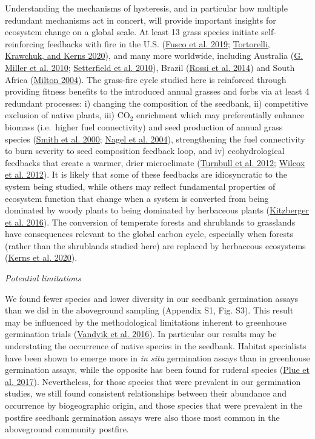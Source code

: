 \documentclass[
  12pt,
]{article}
\begin{document}
Understanding the mechanisms of hysteresis, and in particular how
multiple redundant mechanisms act in concert, will provide important
insights for ecosystem change on a global scale. At least 13 grass
species initiate self-reinforcing feedbacks with fire in the U.S.
(\protect\hyperlink{ref-Fusco2019}{Fusco et al. 2019};
\protect\hyperlink{ref-Tortorelli2020}{Tortorelli, Krawchuk, and Kerns
2020}), and many more worldwide, including Australia
(\protect\hyperlink{ref-Miller2010}{G. Miller et al. 2010};
\protect\hyperlink{ref-Setterfield2010}{Setterfield et al. 2010}),
Brazil (\protect\hyperlink{ref-Rossi2014}{Rossi et al. 2014}) and South
Africa (\protect\hyperlink{ref-Milton2004}{Milton 2004}). The grass-fire
cycle studied here is reinforced through providing fitness benefits to
the introduced annual grasses and forbs via at least 4 redundant
processes: i) changing the composition of the seedbank, ii) competitive
exclusion of native plants, iii) CO\(_2\) enrichment which may
preferentially enhance biomass (i.e.~higher fuel connectivity) and seed
production of annual grass species
(\protect\hyperlink{ref-Smith2000}{Smith et al. 2000};
\protect\hyperlink{ref-Nagel2004}{Nagel et al. 2004}), strengthening the
fuel connectivity to burn severity to seed composition feedback loop,
and iv) ecohydrological feedbacks that create a warmer, drier
microclimate (\protect\hyperlink{ref-Turnbull2012}{Turnbull et al.
2012}; \protect\hyperlink{ref-Wilcox2012}{Wilcox et al. 2012}). It is
likely that some of these feedbacks are idiosyncratic to the system
being studied, while others may reflect fundamental properties of
ecosystem function that change when a system is converted from being
dominated by woody plants to being dominated by herbaceous plants
(\protect\hyperlink{ref-Kitzberger2016}{Kitzberger et al. 2016}). The
conversion of temperate forests and shrublands to grasslands have
consequences relevant to the global carbon cycle, especially when
forests (rather than the shrublands studied here) are replaced by
herbaceous ecosystems (\protect\hyperlink{ref-Kerns2020}{Kerns et al.
2020}).

\emph{Potential limitations}

We found fewer species and lower diversity in our seedbank germination
assays than we did in the aboveground sampling (Appendix S1, Fig. S3).
This result may be influenced by the methodological limitations inherent
to greenhouse germination trials
(\protect\hyperlink{ref-Vandvik2016}{Vandvik et al. 2016}). In
particular our results may be understating the occurrence of native
species in the seedbank. Habitat specialists have been shown to emerge
more in \emph{in situ} germination assays than in greenhouse germination
assays, while the opposite has been found for ruderal species
(\protect\hyperlink{ref-Plue2017}{Plue et al. 2017}). Nevertheless, for
those species that were prevalent in our germination studies, we still
found consistent relationships between their abundance and occurrence by
biogeographic origin, and those species that were prevalent in the
postfire seedbank germination assays were also those most common in the
aboveground community postfire.
\end{document}
